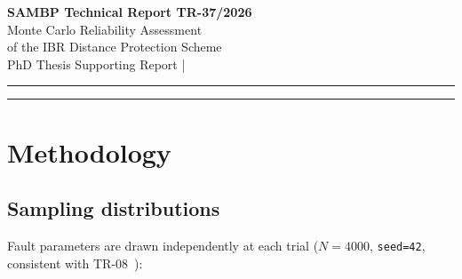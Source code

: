\documentclass[11pt,a4paper]{article}
\begin{document}
\begin{center}
  {\LARGE\bfseries\color{sambpblue} SAMBP Technical Report TR-37/2026}\\[6pt]
  {\large Monte Carlo Reliability Assessment\\
    of the IBR Distance Protection Scheme}\\[10pt]
  {\normalsize PhD Thesis Supporting Report \quad|}
\end{center}

\vspace{2pt}\hrule\vspace{8pt}

\begin{abstract}
\noindent
This report provides a Monte Carlo reliability assessment of the complete IBR
line protection scheme developed in TR-29--TR-36.  4000 fault scenarios are
sampled from physically motivated distributions ($k_\mathrm{ibr}\sim U[0.04,0.50]$,
$\alpha\sim U[0,1.05]$, fault type weighted by CIGRE statistics, arc resistance
exponential with mean 4\,m$\Omega$).  The scheme achieves overall dependability
$P_\mathrm{dep}=99.61\%$; all 15 missed faults have $k_\mathrm{ibr}<0.06$
(below the 87L current threshold) and are structurally unprotectable by any relay
element.  Fast clearance (within $T_\mathrm{mem}=100$\,ms) is 100\% of all
cleared faults, with mean clearance time 20.4\,ms.  Regions~B, C, and~D
achieve $P_\mathrm{dep}=1.000$; Region~A reaches 97.09\% (the residual 2.91\%
are $k<0.06$ structural misses).  A four-scenario IBR-penetration sensitivity
study confirms $P_\mathrm{dep}=1.000$ for all scenarios with $k_\mathrm{ibr}\geq0.06$.
The auto-reclosing chain (TR-36) clears 100\% of permanent-fault reclose
scenarios via 87L (memory-independent).
\end{abstract}

\vspace{4pt}\hrule\vspace{10pt}

\section{Methodology}
\label{sec:method}

\subsection{Sampling distributions}

Fault parameters are drawn independently at each trial ($N=4000$, \texttt{seed=42},
consistent with TR-08~\cite{SAMBP_TR08}):
\end{document}

